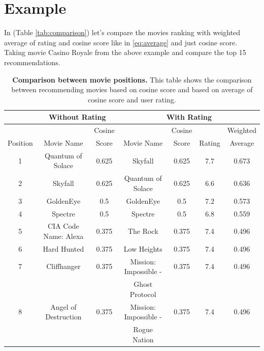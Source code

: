 \section{Example}

In (Table \ref{tab:comparison}) let's compare the movies ranking with weighted average of rating and cosine score like in \eqref{eq:average} and just cosine score. Taking movie Casino Royale from the above example and compare the top 15 recommendations.

\begin{table}[ht]
	\centering
	\caption{\textbf{Comparison between movie positions.} This table shows the comparison between recommending movies based on cosine score and based on average of cosine score and user rating.}	
	\footnotesize
	\begin{tabular}{c|cc|cccc}
	\toprule
	         & \multicolumn{2}{c|}{Without Rating} & \multicolumn{4}{c}{With Rating}                \\
	\midrule
	         &                      & Cosine &                         & Cosine &        & Weighted \\
	Position & Movie Name           & Score  & Movie Name              & Score  & Rating & Average  \\
	\midrule
	1        & Quantum of Solace    & 0.625  & Skyfall                 & 0.625  & 7.7    & 0.673    \\
	2        & Skyfall              & 0.625  & Quantum of Solace       & 0.625  & 6.6    & 0.636    \\
	3        & GoldenEye            & 0.5    & GoldenEye               & 0.5    & 7.2    & 0.573    \\
	4        & Spectre              & 0.5    & Spectre                 & 0.5    & 6.8    & 0.559    \\
	5        & CIA Code Name: Alexa & 0.375  & The Rock                & 0.375  & 7.4    & 0.496    \\
	6        & Hard Hunted          & 0.375  & Low Heights             & 0.375  & 7.4    & 0.496    \\
	7        & Cliffhanger          & 0.375  & Mission: Impossible -   & 0.375  & 7.4    & 0.496    \\
	         &                      &        & Ghost Protocol          &        &        &          \\
	8        & Angel of Destruction & 0.375  & Mission: Impossible -   & 0.375  & 7.4    & 0.496    \\
	         &                      &        & Rogue Nation            &        &        &          \\

\end{tabular}
\end{table}
